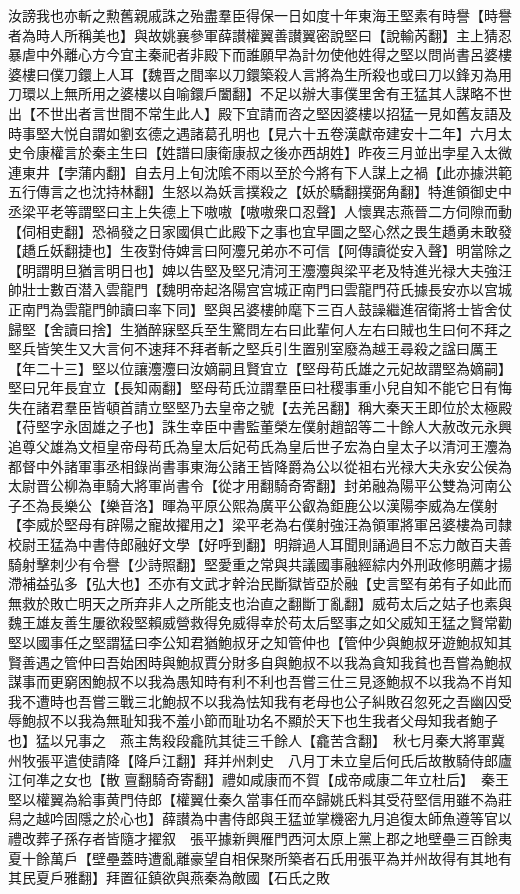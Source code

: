汝謗我也亦斬之勲舊親戚誅之殆盡羣臣得保一日如度十年東海王堅素有時譽【時譽者為時人所稱美也】與故姚襄參軍薛讃權翼善讃翼密說堅曰【說輸芮翻】主上猜忍暴虐中外離心方今宜主秦祀者非殿下而誰願早為計勿使他姓得之堅以問尚書呂婆樓婆樓曰僕刀鐶上人耳【魏晋之間率以刀鐶築殺人言將為生所殺也或曰刀以鋒刃為用刀環以上無所用之婆樓以自喻鐶戶闔翻】不足以辦大事僕里舍有王猛其人謀略不世出【不世出者言世間不常生此人】殿下宜請而咨之堅因婆樓以招猛一見如舊友語及時事堅大悦自謂如劉玄德之遇諸葛孔明也【見六十五卷漢獻帝建安十二年】六月太史令康權言於秦主生曰【姓譜曰康衛康叔之後亦西胡姓】昨夜三月並出孛星入太微連東井【孛蒲内翻】自去月上旬沈隂不雨以至於今將有下人謀上之禍【此亦據洪範五行傳言之也沈持林翻】生怒以為妖言撲殺之【妖於驕翻撲弼角翻】特進領御史中丞梁平老等謂堅曰主上失德上下嗷嗷【嗷嗷衆口忍聲】人懷異志燕晉二方伺隙而動【伺相吏翻】恐禍發之日家國俱亡此殿下之事也宜早圖之堅心然之畏生趫勇未敢發【趫丘妖翻捷也】生夜對侍婢言曰阿灋兄弟亦不可信【阿傳讀從安入聲】明當除之【明謂明旦猶言明日也】婢以告堅及堅兄清河王灋灋與梁平老及特進光禄大夫強汪帥壯士數百潜入雲龍門【魏明帝起洛陽宫宫城正南門曰雲龍門苻氏據長安亦以宫城正南門為雲龍門帥讀曰率下同】堅與呂婆樓帥麾下三百人鼓譟繼進宿衛將士皆舍仗歸堅【舍讀曰捨】生猶醉寐堅兵至生驚問左右曰此輩何人左右曰賊也生曰何不拜之堅兵皆笑生又大言何不速拜不拜者斬之堅兵引生置别室廢為越王尋殺之諡曰厲王【年二十三】堅以位讓灋灋曰汝嫡嗣且賢宜立【堅母苟氏雄之元妃故謂堅為嫡嗣】堅曰兄年長宜立【長知兩翻】堅母苟氏泣謂羣臣曰社稷事重小兒自知不能它日有悔失在諸君羣臣皆頓首請立堅堅乃去皇帝之號【去羌呂翻】稱大秦天王即位於太極殿【苻堅字永固雄之子也】誅生幸臣中書監董榮左僕射趙韶等二十餘人大赦改元永興追尊父雄為文桓皇帝母苟氏為皇太后妃苟氏為皇后世子宏為白皇太子以清河王灋為都督中外諸軍事丞相錄尚書事東海公諸王皆降爵為公以從祖右光禄大夫永安公侯為太尉晋公柳為車騎大將軍尚書令【從才用翻騎奇寄翻】封弟融為陽平公雙為河南公子丕為長樂公【樂音洛】暉為平原公熙為廣平公叡為鉅鹿公以漢陽李威為左僕射【李威於堅母有辟陽之寵故擢用之】梁平老為右僕射強汪為領軍將軍呂婆樓為司隸校尉王猛為中書侍郎融好文學【好呼到翻】明辯過人耳聞則誦過目不忘力敵百夫善騎射擊刺少有令譽【少詩照翻】堅愛重之常與共議國事融經綜内外刑政修明薦才揚滯補益弘多【弘大也】丕亦有文武才幹治民斷獄皆亞於融【史言堅有弟有子如此而無救於敗亡明天之所弃非人之所能支也治直之翻斷丁亂翻】威苟太后之姑子也素與魏王雄友善生屢欲殺堅賴威營救得免威得幸於苟太后堅事之如父威知王猛之賢常勸堅以國事任之堅謂猛曰李公知君猶鮑叔牙之知管仲也【管仲少與鮑叔牙遊鮑叔知其賢善遇之管仲曰吾始困時與鮑叔賈分財多自與鮑叔不以我為貪知我貧也吾嘗為鮑叔謀事而更窮困鮑叔不以我為愚知時有利不利也吾嘗三仕三見逐鮑叔不以我為不肖知我不遭時也吾嘗三戰三北鮑叔不以我為怯知我有老母也公子糾敗召忽死之吾幽囚受辱鮑叔不以我為無耻知我不羞小節而耻功名不顯於天下也生我者父母知我者鮑子也】猛以兄事之　燕主雋殺段龕阬其徒三千餘人【龕苦含翻】　秋七月秦大將軍冀州牧張平遣使請降【降戶江翻】拜并州刺史　八月丁未立皇后何氏后故散騎侍郎廬江何凖之女也【散亶翻騎奇寄翻】禮如咸康而不賀【成帝咸康二年立杜后】　秦王堅以權翼為給事黄門侍郎【權翼仕秦久當事任而卒歸姚氏料其受苻堅信用雖不為莊舄之越吟固隱之於心也】薛讃為中書侍郎與王猛並掌機密九月追復太師魚遵等官以禮改葬子孫存者皆隨才擢叙　張平據新興雁門西河太原上黨上郡之地壁壘三百餘夷夏十餘萬戶【壁壘蓋時遭亂離豪望自相保聚所築者石氏用張平為并州故得有其地有其民夏戶雅翻】拜置征鎮欲與燕秦為敵國【石氏之敗